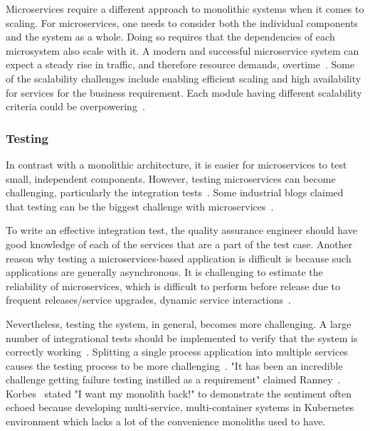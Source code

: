 Microservices require a different approach to monolithic systems when it comes to scaling. For microservices, one needs to consider both the individual components and the system as a whole. Doing so requires that the dependencies of each microsystem also scale with it.
A modern and successful microservice system can expect a steady rise in traffic, and therefore resource demands, overtime~\cite{Etsy, Soundcloud}.
Some of the scalability challenges include enabling efficient scaling and high availability for services for the business requirement. Each module having different scalability criteria could be overpowering~\cite{khan2020}.



\subsubsection{Testing}%

In contrast with a monolithic architecture, it is easier for microservices to test small, independent components. However, testing microservices can become challenging, particularly the integration tests~\cite{Dmitrii2019}. Some industrial blogs claimed that testing can be the biggest challenge with microservices~\cite{Karma, Soundcloud}.

To write an effective integration test, the quality assurance engineer should have good knowledge of each of the services that are a part of the test case. Another reason why testing a microservices-based application is difficult is because such applications are generally asynchronous. It is challenging to estimate the reliability of microservices, which is difficult to perform before release due to frequent releases/service upgrades, dynamic service interactions~\cite{Russo2020}. 

Nevertheless, testing the system, in general, becomes more challenging. A large number of integrational tests should be implemented to verify that the system is correctly working~\cite{Zaytev2018}. Splitting a single process application into multiple services causes the testing process to be more challenging~\cite{Huttunen2017}.
"It has been an incredible challenge getting failure testing instilled as a requirement" claimed Ranney~\cite{Matt2016}.
%
Korbes~\cite{Ellen2018} stated "I want my monolith back!" to demonstrate the sentiment often echoed because developing multi-service, multi-container systems in Kubernetes environment which lacks a lot of the convenience monoliths used to have.



